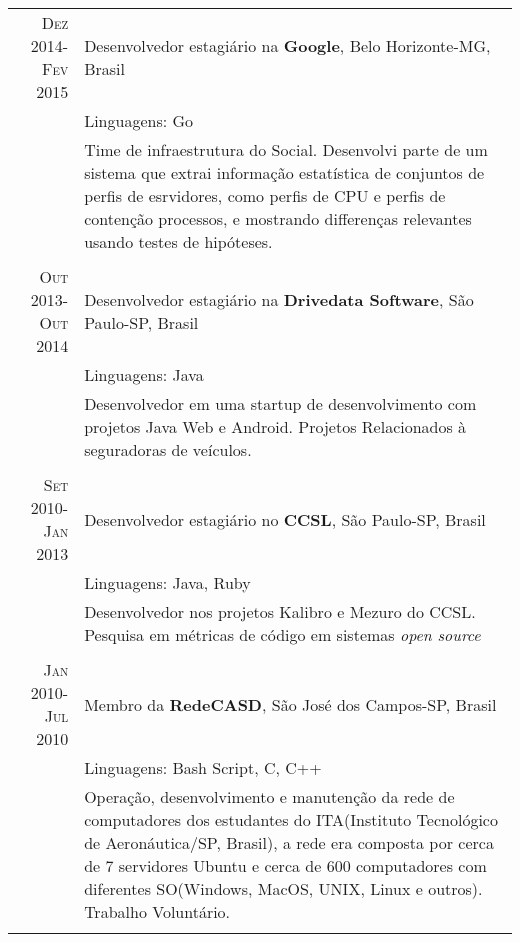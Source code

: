 \documentclass[a4paper,10pt]{article} %
\begin{document}
\begin{tabular}{r|p{11cm}}

\textsc{Dez 2014-Fev 2015} & Desenvolvedor estagiário na \textbf{Google}, Belo Horizonte-MG, Brasil \emph{}\\
& \footnotesize{Linguagens: Go}\\
       & \footnotesize{Time de infraestrutura do Social. Desenvolvi parte de um sistema que extrai informação estatística de conjuntos de perfis de esrvidores, como perfis de CPU e perfis de contenção processos, e mostrando differenças relevantes usando testes de hipóteses.} \\
       \multicolumn{2}{c}{} \\
       
       
\textsc{Out 2013-Out 2014} & Desenvolvedor estagiário na \textbf{Drivedata Software}, São Paulo-SP, Brasil \emph{}\\
& \footnotesize{Linguagens: Java}\\
       & \footnotesize{Desenvolvedor em uma startup de desenvolvimento com projetos Java Web e Android. Projetos Relacionados à seguradoras de veículos.} \\
       \multicolumn{2}{c}{} \\	
       

\textsc{Set 2010-Jan 2013} & Desenvolvedor estagiário no \textbf{CCSL}, São Paulo-SP, Brasil \emph{}\\
& \footnotesize{Linguagens: Java, Ruby}\\
       & \footnotesize{Desenvolvedor nos projetos Kalibro e Mezuro do CCSL. Pesquisa em métricas de código em
       sistemas \emph{open source}} \\
       \multicolumn{2}{c}{} \\
	

\textsc{Jan 2010-Jul 2010} & Membro da \textbf{RedeCASD}, São José dos Campos-SP, Brasil \emph{}\\
& \footnotesize{Linguagens: Bash Script, C, C++}\\
       & \footnotesize{Operação, desenvolvimento e manutenção da rede de computadores dos estudantes do ITA(Instituto
       Tecnológico de Aeronáutica/SP, Brasil), a rede era composta por cerca de 7 servidores Ubuntu e cerca
       de 600 computadores com diferentes SO(Windows, MacOS, UNIX, Linux e outros). Trabalho Voluntário.}\\
	\multicolumn{2}{c}{} \\


\end{tabular}
\end{document}
